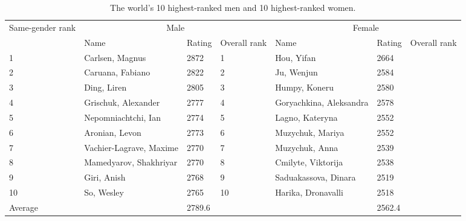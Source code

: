 \begin{table*}[t]
    \centering
    \begin{tabular}{|l|l|l|l||l|l|l|}
    \hline
    \multirow{2}{*}{Same-gender rank} & \multicolumn{3}{c||}{Male} & \multicolumn{3}{c|}{Female}\\
    \cline{2-7}
    & Name & Rating & Overall rank  & Name & Rating & Overall rank \\
    \hline
       1  & Carlsen, Magnus & 2872 & 1 & Hou, Yifan & 2664 &  \\
       2  & Caruana, Fabiano & 2822 & 2  & Ju, Wenjun & 2584 &  \\
       3  & Ding, Liren & 2805 & 3 & Humpy, Koneru & 2580 &  \\
       4  & Grischuk, Alexander & 2777 & 4 & Goryachkina, Aleksandra & 2578 &  \\
       5  & Nepomniachtchi, Ian & 2774 & 5 & Lagno, Kateryna & 2552 &  \\
       6  &  Aronian, Levon & 2773 & 6 & Muzychuk, Mariya & 2552 &  \\
       7  & Vachier-Lagrave, Maxime	 & 2770 & 7 & Muzychuk, Anna & 2539 &  \\
       8  & Mamedyarov, Shakhriyar & 2770 & 8 & Cmilyte, Viktorija & 2538 &  \\
       9  & Giri, Anish & 2768 & 9 & Saduakassova, Dinara & 2519 &  \\
       10  & So, Wesley & 2765 & 10 & Harika, Dronavalli & 2518 &  \\
         \hline
         Average & & 2789.6 & & & 2562.4 & \\
         \hline
    \end{tabular}
    \caption{The world's 10 highest-ranked men and 10 highest-ranked women.  }
    \label{tab:top_10}
\end{table*}




